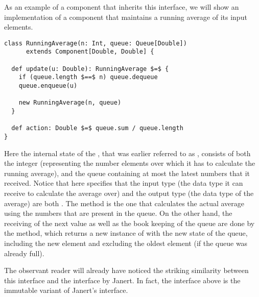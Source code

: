 As an example of a component that inherits this interface, we will show an implementation of a component that maintains a running average of its input elements.

\begin{lstlisting}[style=ScalaStyle]
class RunningAverage(n: Int, queue: Queue[Double])
      extends Component[Double, Double] {

  def update(u: Double): RunningAverage $=$ {
    if (queue.length $==$ n) queue.dequeue
    queue.enqueue(u)

    new RunningAverage(n, queue)
  }

  def action: Double $=$ queue.sum / queue.length
}
\end{lstlisting}

Here the internal state of the \comp, that was earlier referred to as , consists of both the integer  (representing the number elements over which it has to calculate the running average), and the queue containing at most the latest  numbers that it received. Notice that  here specifies that the input type (the data type it can receive to calculate the average over) and the output type (the data type of the average) are both . The  method is the one that calculates the actual average using the numbers that are present in the queue. On the other hand, the receiving of the next value as well as the book keeping of the queue are done by the  method, which returns a new instance of  with the new state of the queue, including the new element and excluding the oldest element (if the queue was already full).

The observant reader will already have noticed the striking similarity between this interface and the  interface by Janert. In fact, the \comp interface above is the immutable variant of Janert's interface. 



























































